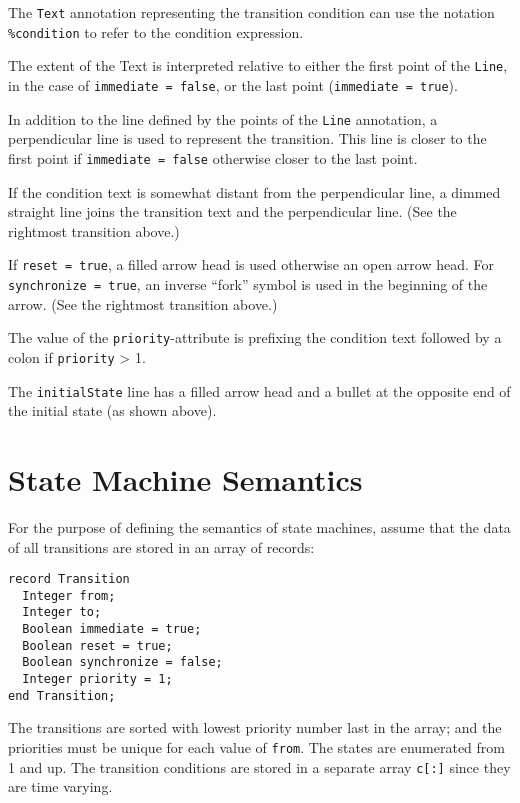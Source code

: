 The \lstinline!Text! annotation representing the transition condition can use the notation \lstinline!%condition! to refer to the condition expression.

The extent of the Text is interpreted relative to either the first point of the \lstinline!Line!, in the case of \lstinline!immediate = false!, or the last point (\lstinline!immediate = true!).

In addition to the line defined by the points of the \lstinline!Line! annotation, a perpendicular line is used to represent the transition.
This line is closer to the first point if \lstinline!immediate = false! otherwise closer to the last point.

If the condition text is somewhat distant from the perpendicular line, a dimmed straight line joins the transition text and the perpendicular line.
(See the rightmost transition above.)

If \lstinline!reset = true!, a filled arrow head is used otherwise an open arrow head.
For \lstinline!synchronize = true!, an inverse ``fork'' symbol is used in the beginning of the arrow.
(See the rightmost transition above.)

The value of the \lstinline!priority!-attribute is prefixing the condition text followed by a colon if \lstinline!priority! \textgreater{} 1.

The \lstinline!initialState! line has a filled arrow head and a bullet at the opposite end of the initial state (as shown above).

\section{State Machine Semantics}\label{state-machine-semantics}

For the purpose of defining the semantics of state machines, assume that the data of all transitions are stored in an array of records:
\begin{lstlisting}[language=modelica]
record Transition
  Integer from;
  Integer to;
  Boolean immediate = true;
  Boolean reset = true;
  Boolean synchronize = false;
  Integer priority = 1;
end Transition;
\end{lstlisting}

The transitions are sorted with lowest priority number last in the array; and the priorities must be unique for each value of \lstinline!from!.
The states are enumerated from 1 and up.
The transition conditions are stored in a separate array \lstinline!c[:]! since they are time varying.

